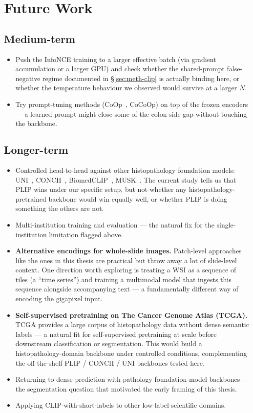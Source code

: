 \section{Future Work}
\label{sec:concl-future}

\subsection*{Medium-term}
\begin{itemize}
    \item Push the InfoNCE training to a larger effective batch (via gradient accumulation or a larger GPU) and check whether the shared-prompt false-negative regime documented in §\ref{sec:meth-clip} is actually binding here, or whether the temperature behaviour we observed would survive at a larger $N$.
    \item Try prompt-tuning methods (CoOp~\cite{zhou2022coop}, CoCoOp) on top of the frozen encoders --- a learned prompt might close some of the colon-side gap without touching the backbone.
\end{itemize}

\subsection*{Longer-term}
\begin{itemize}
    \item Controlled head-to-head against other histopathology foundation models: UNI~\cite{chen2024uni}, CONCH~\cite{lu2024conch}, BiomedCLIP~\cite{zhang2023biomedclip}, MUSK~\cite{xiang2025musk}. The current study tells us that PLIP wins under our specific setup, but not whether any histopathology-pretrained backbone would win equally well, or whether PLIP is doing something the others are not.
    \item Multi-institution training and evaluation --- the natural fix for the single-institution limitation flagged above.
    \item \textbf{Alternative encodings for whole-slide images.} Patch-level approaches like the ones in this thesis are practical but throw away a lot of slide-level context. One direction worth exploring is treating a WSI as a sequence of tiles (a ``time series'') and training a multimodal model that ingests this sequence alongside accompanying text --- a fundamentally different way of encoding the gigapixel input.
    \item \textbf{Self-supervised pretraining on The Cancer Genome Atlas (TCGA).} TCGA provides a large corpus of histopathology data without dense semantic labels --- a natural fit for self-supervised pretraining at scale before downstream classification or segmentation. This would build a histopathology-domain backbone under controlled conditions, complementing the off-the-shelf PLIP / CONCH / UNI backbones tested here.
    \item Returning to dense prediction with pathology foundation-model backbones --- the segmentation question that motivated the early framing of this thesis.
    \item Applying CLIP-with-short-labels to other low-label scientific domains.
\end{itemize}



